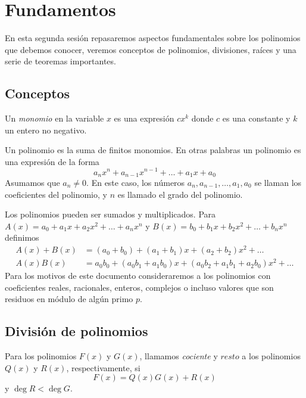 \section{Fundamentos}

En esta segunda sesión repasaremos aspectos fundamentales sobre los polinomios que debemos conocer, veremos conceptos de
polinomios, divisiones, raíces y una serie de teoremas importantes.

\subsection{Conceptos}

\begin{definition}
    Un \textit{monomio} en la variable $x$ es una expresión $c x^k$ donde $c$ es una constante y $k$ un entero no negativo.
\end{definition}

Un polinomio es la suma de finitos monomios.
En otras palabras un polinomio es una expresión de la forma
\[
    a_n x^n + a_{n - 1} x^{n - 1} + \ldots + a_1 x + a_0
\]
Asumamos que $a_n \neq 0$.
En este caso, los números $a_n, a_{n - 1}, \ldots, a_1, a_0$ se llaman los coeficientes del polinomio, y $n$ es llamado el grado del polinomio.

Los polinomios pueden ser sumados y multiplicados.
Para $A(x) = a_0 + a_1 x + a_2 x^2 + \ldots +a_n x^n$ y $B(x) = b_0 + b_1 x + b_2 x^2 + \ldots + b_n x^n$ definimos
\begin{align*}
    A(x) + B(x) &= (a_0 + b_0) + (a_1 + b_1)x + (a_2 + b_2)x^2 + \ldots\\[2mm]
    A(x)B(x) &= a_0 b_0 + (a_0 b_1 + a_1 b_0)x + (a_0 b_2 + a_1 b_1 + a_2 b_0)x^2 + \ldots
\end{align*}
Para los motivos de este documento consideraremos a los polinomios con coeficientes reales, racionales, enteros, complejos o incluso
valores que son residuos en módulo de algún primo $p$.

\subsection{División de polinomios}

\begin{definition}
    Para los polinomios $F(x)$ y $G(x)$, llamamos \textit{cociente} y $\textit{resto}$ a los polinomios $Q(x)$ y $R(x)$,
    respectivamente, si
    \[
        F(x) = Q(x) G(x) + R(x)
    \]
    y $\deg{R} < \deg{G}$.
\end{definition}


